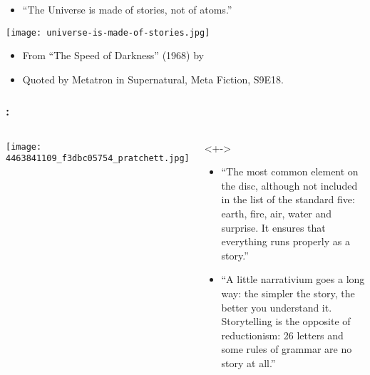 \begin{frame}

  \begin{center}
    
    \begin{itemize}
    \item 
    ``The Universe is made of stories, not of atoms.''
    \end{itemize}

    \texttt{[image: universe-is-made-of-stories.jpg]}

    \begin{itemize}
    \item<+->
      From ``The Speed of Darkness'' (1968) by
    \item<+->
      Quoted by Metatron in Supernatural, Meta Fiction, S9E18.
    \end{itemize}
  \end{center}

\end{frame}

\begin{frame}
  \frametitle{
    :
  }

  \begin{columns}
    \texttt{[image: 4463841109\_f3dbc05754\_pratchett.jpg]}
    \begin{block}<+->{}
        \begin{itemize}
        \item<+-> 
          ``The most common element on the disc, although not
          included in the list of the standard five: earth, fire, air,
          water and surprise. It ensures that everything runs properly
          as a story.''
        \item<+->
          ``A little narrativium goes a long way: the simpler the story,
          the better you understand it. Storytelling is the opposite of
          reductionism: 26 letters and some rules of grammar are no story
          at all.''
        \end{itemize}
      \end{block}
    \end{columns}


\end{frame}

